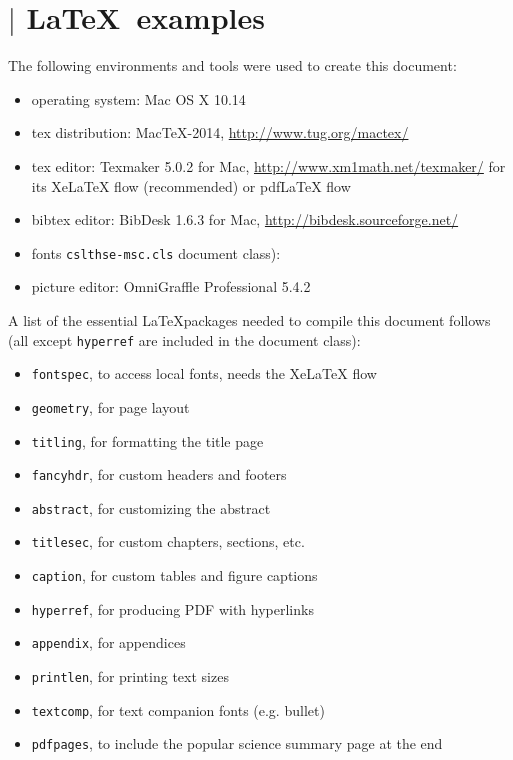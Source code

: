 \chapter{$\vert$ \LaTeX~examples}
\label{chap:appc}

The following environments and tools were used to create this document:
\begin{itemize}
\item operating system: Mac OS X 10.14
\item tex distribution: MacTeX-2014, \url{http://www.tug.org/mactex/}
\item tex editor: Texmaker 5.0.2 for Mac, \url{http://www.xm1math.net/texmaker/} for its XeLaTeX flow (recommended) or pdfLaTeX flow
\item bibtex editor: BibDesk 1.6.3 for Mac, \url{http://bibdesk.sourceforge.net/}
\item fonts \texttt{cslthse-msc.cls} document class): 
\item picture editor: OmniGraffle Professional 5.4.2
\end{itemize}

\noindent A list of the essential \LaTeX packages needed to compile this document follows (all except \texttt{hyperref} are included in the document class):
\begin{itemize}
\item \texttt{fontspec}, to access local fonts, needs the XeLaTeX flow
\item \texttt{geometry}, for page layout
\item \texttt{titling}, for formatting the title page
\item \texttt{fancyhdr}, for custom headers and footers
\item \texttt{abstract}, for customizing the abstract
\item \texttt{titlesec}, for custom chapters, sections, etc.
\item \texttt{caption}, for custom tables and figure captions
\item \texttt{hyperref}, for producing PDF with hyperlinks
\item \texttt{appendix}, for appendices
\item \texttt{printlen}, for printing text sizes
\item \texttt{textcomp}, for text companion fonts (e.g. bullet)
\item \texttt{pdfpages}, to include the popular science summary page at the end
\end{itemize}


